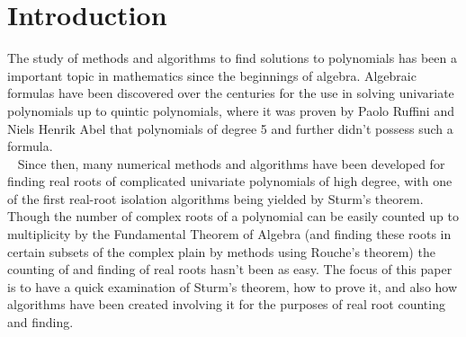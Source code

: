 \documentclass[a4paper]{article}
\begin{document}

\section{Introduction}
The study of methods and algorithms to find solutions to polynomials has been a important topic in mathematics since the beginnings of algebra. Algebraic formulas have been discovered over the centuries for the use in solving univariate polynomials up to quintic polynomials, where it was proven by Paolo Ruffini and Niels Henrik Abel that polynomials of degree 5 and further didn't possess such a formula.
\\~
Since then, many numerical methods and algorithms have been developed for finding real roots of complicated univariate polynomials of high degree, with one of the first real-root isolation algorithms being yielded by Sturm's theorem. Though the number of complex roots of a polynomial can be easily counted up to multiplicity by the Fundamental Theorem of Algebra (and finding these roots in certain subsets of the complex plain by methods using Rouche's theorem) the counting of and finding of real roots hasn't been as easy. The focus of this paper is to have a quick examination of Sturm's theorem, how to prove it, and also how algorithms have been created involving it for the purposes of real root counting and finding.
\end{document}
